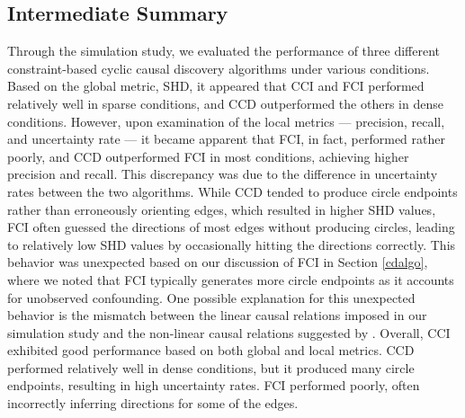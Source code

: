 \documentclass[twoside, 11pt]{article}
\begin{document}
\subsection{Intermediate Summary}
Through the simulation study, we evaluated the performance of three different constraint-based cyclic causal discovery algorithms under various conditions. 
Based on the global metric, SHD, it appeared that CCI and FCI performed relatively well in sparse conditions, and CCD outperformed the others in dense conditions. However, upon examination of the local metrics --- precision, recall, and uncertainty rate --- it became apparent that FCI, in fact, performed rather poorly, and CCD outperformed FCI in most conditions, achieving higher precision and recall. This discrepancy was due to the difference in uncertainty rates between the two algorithms. 
While CCD tended to produce circle endpoints rather than erroneously orienting edges, which resulted in higher SHD values, FCI often guessed the directions of most edges without producing circles, leading to relatively low SHD values by occasionally hitting the directions correctly. 
This behavior was unexpected based on our discussion of FCI in Section \ref{cdalgo}, where we noted that FCI typically generates more circle endpoints as it accounts for unobserved confounding. 
One possible explanation for this unexpected behavior is the mismatch between the linear causal relations imposed in our simulation study and the non-linear causal relations suggested by \cite{mooij_classen2020}.
Overall, CCI exhibited good performance based on both global and local metrics. CCD performed relatively well in dense conditions, but it produced many circle endpoints, resulting in high uncertainty rates. FCI performed poorly, often incorrectly inferring directions for some of the edges. 
\end{document}
